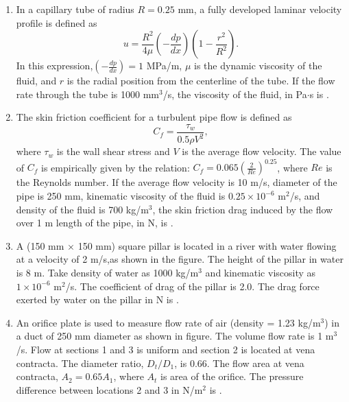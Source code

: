 \documentclass[journal,12pt,onecolumn]{IEEEtran}
\theoremstyle{remark}
\begin{document}
\begin{enumerate}

 \item In a capillary tube of radius $R = 0.25$ mm, a fully developed laminar velocity profile is defined as 
 $$u = \frac{R^2}{4 \mu} (-\frac{dp}{dx})(1-\frac{r^2}{R^2}).$$
 In this expression,$(-\frac{dp}{dx}) = 1$ MPa/m, $\mu$ is the dynamic viscosity of the fluid, and $r$ is the radial position from the centerline of the tube. If the flow rate through the tube is 1000 mm$^3$/s, the viscosity of the fluid, in Pa$\cdot$s is {\underline{\hspace{2cm}}}.

    \item The skin friction coefficient for a turbulent pipe flow is defined as 
    $$C_f = \frac{\tau_w}{0.5 \rho V^2},$$ where $\tau_w$ is the wall shear stress and $V$ is the average flow velocity. The value of $C_f$ is empirically given by the relation: $C_f = 0.065(\frac{2}{Re})^{0.25}$, where $Re$ is the Reynolds number. If the average flow velocity is 10 m/s, diameter of the pipe is 250 mm, kinematic viscosity of the fluid is $0.25 \times 10^{-6}$ m$^2$/s, and density of the fluid is 700 kg/m$^3$, the skin friction drag induced by the flow over 1 m length of the pipe, in N, is {\underline{\hspace{2cm}}}.

    \item A (150 mm $\times$ 150 mm) square pillar is located in a river with water flowing at a velocity of 2 m/s,as shown in the figure. The height of the pillar in water is 8 m. Take density of water as 1000 kg/m$^3$ and kinematic viscosity as $1 \times 10^{-6}$ m$^2$/s. The coefficient of drag of the pillar is 2.0. The drag force exerted by water on the pillar in N is {\underline{\hspace{2cm}}}.
    \begin{figure}[H]
        \centering
    \end{figure}

    \item An orifice plate is used to measure flow rate of air (density = 1.23 kg/m$^3$) in a duct of 250 mm diameter as shown in figure. The volume flow rate is 1 m$^3$/s. Flow at sections 1 and 3 is uniform and section 2 is located at vena contracta. The diameter ratio, $D_t/D_1$, is 0.66. The flow area at vena contracta, $A_2 = 0.65 A_1$, where $A_t$ is area of the orifice. The pressure difference between locations 2 and 3 in N/m$^2$ is {\underline{\hspace{2cm}}}.


\end{enumerate}
\end{document}
